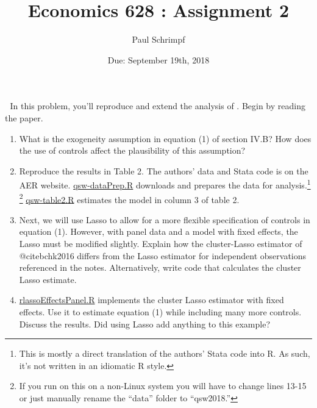 

\title{Economics 628 : Assignment 2}
\author{Paul Schrimpf}
\date{Due: September 19th, 2018}


\maketitle


\begin{problem}$\;$
  In this problem, you'll reproduce and extend the analysis of
  \cite{qsw2018}. Begin by reading the paper.
  \begin{enumerate}
  \item What is the exogeneity assumption in equation (1) of section
    IV.B? How does the use of controls affect the plausibility of this
    assumption?
  \item Reproduce the results in Table 2. The authors' data and Stata
    code is on the AER website.
    \href{https://github.com/ubcecon/ECON628_2018/tree/master/paul/assignments/02/qsw-dataPrep.R}
    {qsw-dataPrep.R} 
    downloads and prepares the data for analysis.\footnote{This is
      mostly a direct translation of the authors' Stata code into
      R. As such, it's not written in an idiomatic R style.}
    \footnote{If you
      run on this on a non-Linux system you will have to change lines
      13-15 or just manually rename the ``data'' folder to ``qsw2018.''}
    \href{https://github.com/ubcecon/ECON628_2018/tree/master/paul/assignments/02/qsw-table2.R}
    {qsw-table2.R} estimates the model in column 3 of table 2.
  \item Next, we will use Lasso to allow for a more flexible
    specification of controls in equation (1). However, with panel
    data and a model with fixed effects, the Lasso must be modified
    slightly. Explain how the cluster-Lasso estimator of
    @cite{bchk2016} differs from the Lasso estimator for independent
    observations referenced in the notes. Alternatively, write code
    that calculates the cluster Lasso estimate. 
  \item
    \href{https://github.com/ubcecon/ECON628_2018/tree/master/paul/assignments/02/rlassoPanel.R}
    {rlassoEffectsPanel.R}
    implements the cluster Lasso estimator with fixed effects. Use it
    to estimate equation (1) while including many 
    more controls. Discuss the results. Did using Lasso add anything
    to this example?
  \end{enumerate}
\end{problem}







